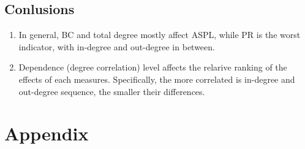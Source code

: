 \documentclass{article}
\begin{document}
\subsection{Conlusions}
\begin{enumerate}
\item In general, BC and total degree mostly affect ASPL, while PR is the worst indicator, with in-degree and out-degree in between.
\item Dependence (degree correlation) level affects the relarive ranking of the effects of each measures. Specifically, the more correlated is in-degree and out-degree sequence, the smaller their differences.
\end{enumerate}


\section{Appendix}
\end{document}
